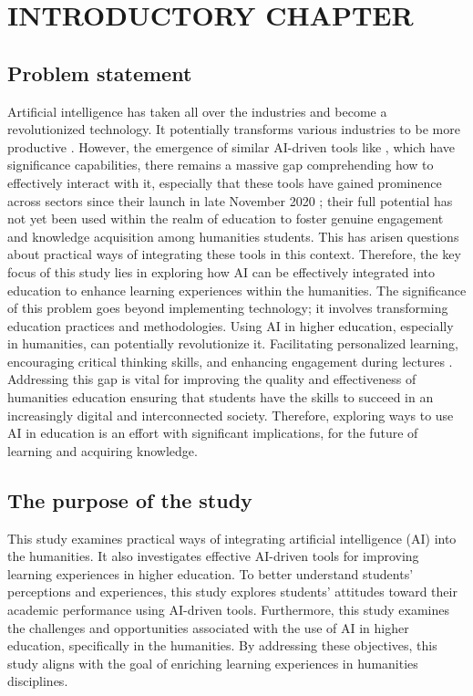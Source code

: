 \chapter{INTRODUCTORY CHAPTER}\label{ch:introductory-chapter}
\section{Problem statement}\label{sec:problem-statement}
\justifying
Artificial intelligence has taken all over the industries and become a revolutionized technology.
It potentially transforms various industries to be more productive \citep{Dirk_Czarnitzki}.
However, the emergence of similar AI-driven tools like , which have significance
capabilities, there remains a massive gap comprehending how to effectively
interact with it,
especially that these tools have gained prominence across
sectors since their launch in late November 2020 \citep{MarrB_2023}; their full potential
has not yet been used within the realm of education to foster genuine
engagement and knowledge acquisition among humanities students.
This has arisen questions about practical ways of integrating these tools in this context.
Therefore, the key focus of this study lies in exploring how AI can be effectively integrated into education
to enhance learning experiences within the humanities.
The significance of this problem goes beyond implementing technology;
it involves transforming education practices and methodologies.
Using AI in higher education, especially in humanities, can potentially
revolutionize it.
Facilitating personalized learning, encouraging critical thinking skills, and
enhancing engagement during lectures \citep{baskara_personalised_2023}.
Addressing this gap is vital for improving the quality and effectiveness of humanities education ensuring
that students have the skills to succeed in an increasingly digital and interconnected society.
Therefore, exploring ways to use AI in education is an effort with significant implications,
for the future of learning and acquiring knowledge.
\section{The purpose of the study}\label{sec:the-purpose-of-the-study}
\justifying
This study examines practical ways of integrating artificial intelligence (AI) into the humanities.
It also investigates effective AI-driven tools for improving learning experiences in higher education.
To better understand students’ perceptions and experiences, this study explores students’ attitudes toward their academic performance using AI-driven tools.
Furthermore, this study examines the challenges and opportunities associated with the use of AI in higher education, specifically in the humanities.
By addressing these objectives, this study aligns with the goal of enriching learning experiences in humanities disciplines.

